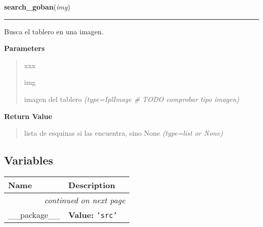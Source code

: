 \hspace{.8\funcindent}\begin{boxedminipage}{\funcwidth}

    \raggedright \textbf{search\_goban}(\textit{img})

    \vspace{-1.5ex}

    \rule{\textwidth}{0.5\fboxrule}
\setlength{\parskip}{2ex}
Busca el tablero en una imagen.

\setlength{\parskip}{1ex}
      \textbf{Parameters}
      \vspace{-1ex}

      \begin{quote}
        \begin{Ventry}{xxx}

          \item[img]


imagen del tablero
            {\it (type=IplImage \# TODO comprobar tipo imagen)}

        \end{Ventry}

      \end{quote}

      \textbf{Return Value}
    \vspace{-1ex}

      \begin{quote}

lista de esquinas si las encuentra, sino None
      {\it (type=list or None)}

      \end{quote}

    \end{boxedminipage}



  \subsection{Variables}

    \vspace{-1cm}
\hspace{\varindent}\begin{longtable}{|p{\varnamewidth}|p{\vardescrwidth}|l}
\cline{1-2}
\cline{1-2} \centering \textbf{Name} & \centering \textbf{Description}& \\
\cline{1-2}
\endhead\cline{1-2}\multicolumn{3}{r}{\small\textit{continued on next page}}\\\endfoot\cline{1-2}
\endlastfoot\raggedright \_\-\_\-p\-a\-c\-k\-a\-g\-e\-\_\-\_\- & \raggedright \textbf{Value:} 
{\tt \texttt{'}\texttt{src}\texttt{'}}&\\
\cline{1-2}
\end{longtable}

